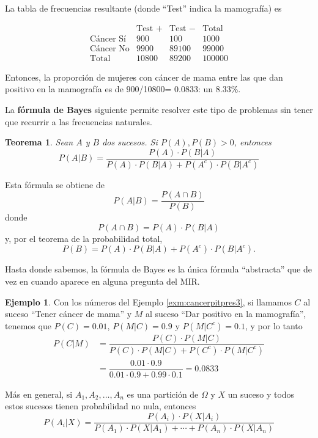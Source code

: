 \documentclass[
]{book}
\newtheorem{theorem}{Teorema}[chapter]
\theoremstyle{definition}
\theoremstyle{definition}
\newtheorem{example}{Ejemplo}[chapter]
\theoremstyle{definition}
\theoremstyle{definition}
\theoremstyle{remark}
\begin{document}
La tabla de frecuencias resultante (donde ``Test'' indica la mamografía) es

\[
\begin{array}{l|c|c|c}
& \text{Test }+ & \text{Test }- & \text{Total}\\
\hline
\text{Cáncer Sí} & 900 & 100 & 1000\\ \hline
\text{Cáncer No} & 9900& 89100 & 99000\\\hline
\text{Total} &10800 & 89200&  100000
\end{array}
\]

Entonces, la proporción de mujeres con cáncer de mama entre las que dan positivo en la mamografía es de 900/10800= 0.0833: un 8.33\%.

La \textbf{fórmula de Bayes} siguiente permite resolver este tipo de problemas sin tener que recurrir a las frecuencias naturales.

\begin{theorem}
\protect\hypertarget{thm:unnamed-chunk-143}{}\label{thm:unnamed-chunk-143}Sean \(A\) y \(B\) dos sucesos. Si \(P(A),P(B)>0\), entonces
\[
P(A|B) =\dfrac{P(A)\cdot P(B|A)}{P(A)\cdot P(B|A)+P(A^c)\cdot P(B|A^c)}
\]
\end{theorem}

Esta fórmula se obtiene de
\[
P(A|B) =\dfrac{P(A \cap B)}{P(B)}
\]
donde
\[
P(A \cap B)=P(A)\cdot P(B|A)
\]
y, por el teorema de la probabilidad total,
\[
P(B)=P(A)\cdot P(B|A)+P(A^c)\cdot P(B|A^c).
\]

\begin{rmdcaution}
Hasta donde sabemos, la fórmula de Bayes es la única fórmula ``abstracta'' que de vez en cuando aparece en alguna pregunta del MIR.
\end{rmdcaution}

\begin{example}
\protect\hypertarget{exm:cancerpitpres4}{}\label{exm:cancerpitpres4}Con los números del Ejemplo \ref{exm:cancerpitpres3}, si llamamos \(C\) al suceso ``Tener cáncer de mama'' y \(M\) al suceso ``Dar positivo en la mamografía'', tenemos que \(P(C)=0.01\), \(P(M|C)=0.9\) y \(P(M|C^c)=0.1\), y por lo tanto
\[
\begin{array}{rl}
P(C|M)\!\!\!\! & =\dfrac{P(C)\cdot P(M|C)}{P(C)\cdot P(M|C)+P(C^c)\cdot P(M|C^c)}\\
& =\dfrac{0.01\cdot 0.9}{0.01\cdot 0.9+0.99\cdot 0.1}=0.0833
\end{array}
\]
\end{example}

Más en general, si \(A_1,A_2,\ldots,A_n\) es una partición de \(\Omega\) y \(X\) un suceso y todos estos sucesos tienen probabilidad no nula, entonces
\[
P(A_i|X) =\dfrac{P(A_i)\cdot P(X|A_i)}{P(A_1)\cdot P(X|A_1)+\cdots+P(A_n)\cdot P(X|A_n)}
\]
\end{document}
